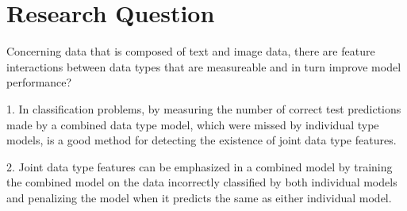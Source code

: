 \chapter{Research Question}


Concerning data that is composed of text and image data, there are feature interactions between data types that are measureable and in turn improve model performance?




1. In classification problems, by measuring the number of correct test predictions made by a combined data type model, which were missed by individual type models, is a good method for detecting the existence of joint data type features.

2. Joint data type features can be emphasized in a combined model by training the combined model on the data incorrectly classified by both individual models and penalizing the model when it predicts the same as either individual model.



